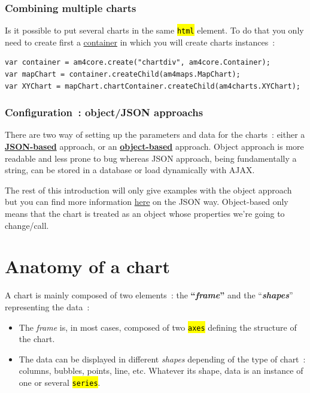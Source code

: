 \documentclass[a4paper,12pt,twoside]{book}
\let\OldTexttt\texttt
\renewcommand{\texttt}[1]{\OldTexttt{\hl{#1}}}
\begin{document}
				\subsubsection{Combining multiple charts}\label{combining-multiple-charts}

Is it possible to put several charts in the same \texttt{html} element. To do that you only need to create first a \href{https://www.amcharts.com/docs/v4/concepts/svg-engine/containers/}{container} in which you will create charts instances~:

\begin{lstlisting}
var container = am4core.create("chartdiv", am4core.Container);
var mapChart = container.createChild(am4maps.MapChart);
var XYChart = mapChart.chartContainer.createChild(am4charts.XYChart);
\end{lstlisting}

				\subsubsection{Configuration~: object/JSON approachs}\label{configuration-objectjson-approachs}

There are two way of setting up the parameters and data for the charts~: either a \href{https://www.amcharts.com/docs/v4/getting-started/basics/\#Using_JSON}{\textbf{JSON-based}} approach, or an \href{https://www.amcharts.com/docs/v4/getting-started/basics/\#Object_based_approach}{\textbf{object-based}} approach. Object approach is more readable and less prone to bug whereas JSON approach, being fundamentally a string, can be stored in a database or load dynamically with AJAX.

The rest of this introduction will only give examples with the object approach but you can find more information \href{https://www.amcharts.com/docs/v4/concepts/json-config/}{here} on the JSON way. Object-based only means that the chart is treated as an object whose properties we're going to change/call.

		\section{Anatomy of a chart}\label{anatomy-of-a-chart}

A chart is mainly composed of two elements~: the \textbf{``\emph{frame}''} and the ``\textbf{\emph{shapes}}'' representing the data~:

\begin{itemize}
	\item The \emph{frame} is, in most cases, composed of two \texttt{axes} defining the structure of the chart.
	\item The data can be displayed in different \emph{shapes} depending of the type of chart~: columns, bubbles, points, line, etc. Whatever its shape, data is an instance of one or several \texttt{series}.
\end{itemize}
\end{document}
